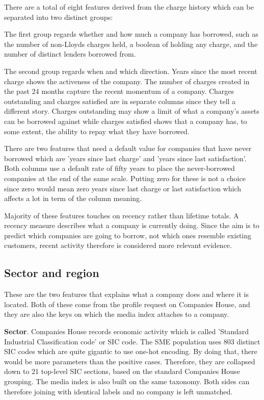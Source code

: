 \documentclass[ %
                    author={Natchalin Iwsakul \\ Inkaphol Siriwongwattana \\ Tanaphan Kummaraphat \\ Patorn Srisupap},
                supervisor={Fernando Moreno-Pino},
                    degree={MSc},
                     title={Propensity Modelling for SME Commercial Lending Using Open Public Data},
                  subtitle={Companies House filings and GDELT media coverage as predictors of first-time borrowing},
                      type={},
                      year={2026}]{dissertation}
\begin{document}
  There are a total of eight features derived from the charge history which can be separated into two distinct groups:

  The first group regards whether and how much a company has borrowed, such as the number of non-Lloyds charges held, a boolean of holding any charge, and the number of distinct lenders borrowed from.

  The second group regards when and which direction. Years since the most recent charge shows the activeness of the company. The number of charges created in the past 24 months capture the recent momentum of a company. Charges outstanding and charges satisfied are in separate columns since they tell a different story. Charges outstanding may show a limit of what a company's assets can be borrowed against while charges satisfied shows that a company has, to some extent, the ability to repay what they have borrowed.

  There are two features that need a default value for companies that have never borrowed which are 'years since last charge' and 'years since last satisfaction'. Both columns use a default rate of fifty years to place the never-borrowed companies at the end of the same scale. Putting zero for these is not a choice since zero would mean zero years since last charge or last satisfaction which affects a lot in term of the column meaning.

  Majority of these features touches on recency rather than lifetime totals. A recency measure describes what a company is currently doing. Since the aim is to predict which companies are going to borrow, not which ones resemble existing customers, recent activity therefore is considered more relevant evidence.
  
  \subsection{Sector and region}
  These are the two features that explains what a company does and where it is located. Both of these come from the profile request on Companies House, and they are also the keys on which the media index attaches to a company.

  \textbf{Sector}. Companies House records economic activity which is called 'Standard Industrial Classification code' or SIC code. The SME population uses 803 distinct SIC codes which are quite gigantic to use one-hot encoding. By doing that, there would be more parameters than the positive cases. Therefore, they are collapsed down to 21 top-level SIC sections, based on the standard Companies House grouping. The media index is also built on the same taxonomy. Both sides can therefore joining with identical labels and no company is left unmatched.
\end{document}
